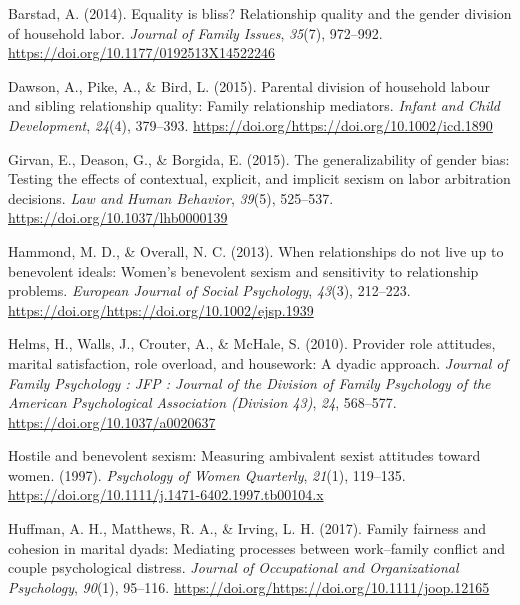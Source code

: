 \documentclass[
  english,
  man]{apa6}
\begin{document}
\leavevmode\hypertarget{ref-doi:10.1177ux2f0192513X14522246}{}%
Barstad, A. (2014). Equality is bliss? Relationship quality and the gender division of household labor. \emph{Journal of Family Issues}, \emph{35}(7), 972--992. \url{https://doi.org/10.1177/0192513X14522246}

\leavevmode\hypertarget{ref-dawson}{}%
Dawson, A., Pike, A., \& Bird, L. (2015). Parental division of household labour and sibling relationship quality: Family relationship mediators. \emph{Infant and Child Development}, \emph{24}(4), 379--393. \url{https://doi.org/https://doi.org/10.1002/icd.1890}

\leavevmode\hypertarget{ref-342e1ecdac0d477ba435b81b89713ffc}{}%
Girvan, E., Deason, G., \& Borgida, E. (2015). The generalizability of gender bias: Testing the effects of contextual, explicit, and implicit sexism on labor arbitration decisions. \emph{Law and Human Behavior}, \emph{39}(5), 525--537. \url{https://doi.org/10.1037/lhb0000139}

\leavevmode\hypertarget{ref-https:ux2fux2fdoi.orgux2f10.1002ux2fejsp.1939}{}%
Hammond, M. D., \& Overall, N. C. (2013). When relationships do not live up to benevolent ideals: Women's benevolent sexism and sensitivity to relationship problems. \emph{European Journal of Social Psychology}, \emph{43}(3), 212--223. \url{https://doi.org/https://doi.org/10.1002/ejsp.1939}

\leavevmode\hypertarget{ref-article2}{}%
Helms, H., Walls, J., Crouter, A., \& McHale, S. (2010). Provider role attitudes, marital satisfaction, role overload, and housework: A dyadic approach. \emph{Journal of Family Psychology : JFP : Journal of the Division of Family Psychology of the American Psychological Association (Division 43)}, \emph{24}, 568--577. \url{https://doi.org/10.1037/a0020637}

\leavevmode\hypertarget{ref-66a87b2ab3f14305bf702cad76e76acf}{}%
Hostile and benevolent sexism: Measuring ambivalent sexist attitudes toward women. (1997). \emph{Psychology of Women Quarterly}, \emph{21}(1), 119--135. \url{https://doi.org/10.1111/j.1471-6402.1997.tb00104.x}

\leavevmode\hypertarget{ref-https:ux2fux2fdoi.orgux2f10.1111ux2fjoop.12165}{}%
Huffman, A. H., Matthews, R. A., \& Irving, L. H. (2017). Family fairness and cohesion in marital dyads: Mediating processes between work--family conflict and couple psychological distress. \emph{Journal of Occupational and Organizational Psychology}, \emph{90}(1), 95--116. \url{https://doi.org/https://doi.org/10.1111/joop.12165}
\end{document}
